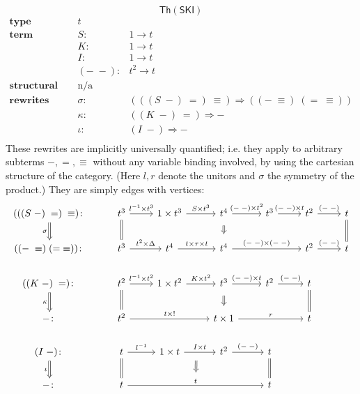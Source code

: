 \documentclass{amsart}
\theoremstyle{definition}
\newcommand{\Th}{\mathsf{Th}}
\newcommand{\maps}{\colon}
\begin{document}
\newpage
\[  \Th(\mathsf{SKI})\]
\[\begin{array}{lrl}
\textbf{type} & t &\\
\textbf{term constructors} & S\maps & 1 \to t\\
& K\maps & 1 \to t\\
& I\maps & 1 \to t\\
& (-\; -)\maps &  t^2 \to t\\
\textbf{structural congruence} & \text{n/a} &\\
\textbf{rewrites} & \sigma\maps & (((S\; -)\; =)\; \equiv) \Rightarrow ((-\; \equiv)\; (=\; \equiv))\\
& \kappa\maps & ((K\; -)\; =) \Rightarrow -\\
& \iota\maps & (I\; -) \Rightarrow -\\
\end{array}\]
These rewrites are implicitly universally quantified; i.e. they apply to arbitrary subterms $-, =, \equiv$ without any variable binding involved, by using the cartesian structure of the category. (Here $l,r$ denote the unitors and $\sigma$ the symmetry of the product.) They are simply edges with vertices:
\[\begin{tikzcd}
(((S\; -)\; =)\; \equiv)\maps \arrow[Rightarrow,d,swap,"\sigma"] & t^3 \arrow[d,equal] \arrow[r,"l^{-1} \times t^3"] & 1\times t^3 \arrow[r,"S \times t^3"] & t^4 \arrow[Rightarrow,d,shorten >=0.2cm,shorten <=0.2cm] \arrow[r,"(-\;-)\times t^2"] & t^3 \arrow[r,"(-\;-) \times t"] & t^2 \arrow[r,"(-\;-)"] & t\arrow[d,equal]\\
((-\; \equiv)\; (=\; \equiv))\maps & t^3 \arrow[r,"t^2 \times \Delta"] & t^4 \arrow[r,"t \times \tau \times t"]& t^4 \arrow[rr,"(-\;-) \times (-\;-)"]&& t^2 \arrow[r,"(-\;-)"]& t\\
((K\; -)\; =)\maps \arrow[Rightarrow,d,swap,"\kappa"] & t^2 \arrow[d,equal] \arrow[r,"l^{-1} \times t^2"] & 1\times t^2 \arrow[r,"K \times t^2"] & t^3 \arrow[Rightarrow,d,shorten >=0.2cm,shorten <=0.2cm] \arrow[r,"(-\;-)\times t"] & t^2 \arrow[r,"(-\;-)"] & t \arrow[d,equal]\\
-\maps & t^2 \arrow[rr,"t \times !"] && t \times 1 \arrow[rr,"r"] && t\\
(I\; -)\maps \arrow[Rightarrow,d,swap,"\iota"] & t \arrow[d,equal] \arrow[r,"l^{-1}"] & 1\times t \arrow[r,"I \times t",""name=1] & t^2 \arrow[r,"(-\;-)"] & t \arrow[d,equal]\\
-\maps & t \arrow[rrr,"t",""name=2] \arrow[Rightarrow,from=1,to=2,start anchor={[xshift=-0.8ex]},shorten >=0.3cm,shorten <=0.3cm] &&& t
\end{tikzcd}\]
\end{document}
